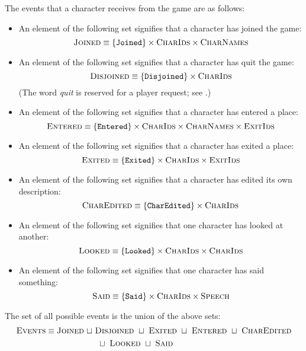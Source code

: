 The events that a character receives from the game are as follows:
\begin{itemize}
\item An element of the following set signifies that a character has
  joined the game:
  \[ \textsc{Joined} \equiv \{ \texttt{Joined} \} \times \textsc{CharIds} \times
  \textsc{CharNames} \]
\item An element of the following set signifies that a character has
  quit the game:
  \[ \textsc{Disjoined} \equiv \{ \texttt{Disjoined} \} \times \textsc{CharIds} \]
  (The word {\em quit} is reserved for a player request; see .)
\item An element of the following set signifies that a character has
  entered a place:
  \[ \textsc{Entered} \equiv \{ \texttt{Entered} \} \times \textsc{CharIds} \times
  \textsc{CharNames} \times \textsc{ExitIds} \]
\item An element of the following set signifies that a character has
  exited a place:
  \[ \textsc{Exited} \equiv \{ \texttt{Exited} \} \times \textsc{CharIds} \times
  \textsc{ExitIds} \]
\item An element of the following set signifies that a character has
  edited its own description:
  \[ \textsc{CharEdited} \equiv \{ \texttt{CharEdited} \} \times \textsc{CharIds} \]
\item An element of the following set signifies that one character has
  looked at another:
  \[ \textsc{Looked} \equiv \{ \texttt{Looked} \} \times \textsc{CharIds}
  \times \textsc{CharIds} \]
\item An element of the following set signifies that one character has
  said something:
  \[ \textsc{Said} \equiv \{ \texttt{Said} \} \times \textsc{CharIds}
  \times \textsc{Speech} \]
\end{itemize}
The set of all possible events is the union of the above sets:
\begin{align}
  \textsc{Events} \equiv \textsc{Joined}
  ~\sqcup~ & \textsc{Disjoined}
  ~\sqcup~ \textsc{Exited}
  ~\sqcup~ \textsc{Entered}
  ~\sqcup~ \textsc{CharEdited} \\ \nonumber
  & ~\sqcup~ \textsc{Looked} ~\sqcup~ \textsc{Said}
\end{align}
